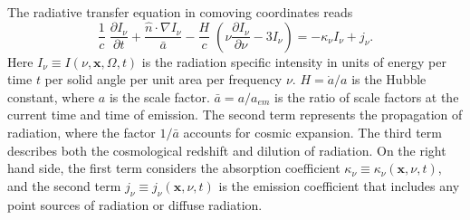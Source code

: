 The radiative transfer equation in comoving coordinates 
\citep[e.g.,][]{Gnedin97} reads
%
\begin{equation}
  \label{eq:rteqn}
  \frac{1}{c} \; \frac{\partial I_\nu}{\partial t} + 
  \frac{\hat{n} \cdot \nabla I_\nu}{\bar{a}} -
  \frac{H}{c} \; \left( \nu \frac{\partial I_\nu}{\partial \nu} -
  3 I_\nu \right) = -\kappa_\nu I_\nu + j_\nu .
\end{equation}
%
Here $I_\nu \equiv I(\nu, \mathbf{x}, \Omega, t)$ is the radiation
specific intensity in units of energy per time $t$ per solid angle per
unit area per frequency $\nu$.  $H = \dot{a}/a$ is the Hubble
constant, where $a$ is the scale factor.  $\bar{a} = a/a_{em}$ is the
ratio of scale factors at the current time and time of emission.  The
second term represents the propagation of radiation, where the factor
$1/\bar{a}$ accounts for cosmic expansion.  The third term describes
both the cosmological redshift and dilution of radiation.  On the
right hand side, the first term considers the absorption coefficient
$\kappa_\nu \equiv \kappa_\nu(\mathbf{x},\nu,t)$, and the second term
$j_\nu \equiv j_\nu(\mathbf{x},\nu,t)$ is the emission coefficient
that includes any point sources of radiation or diffuse radiation.


